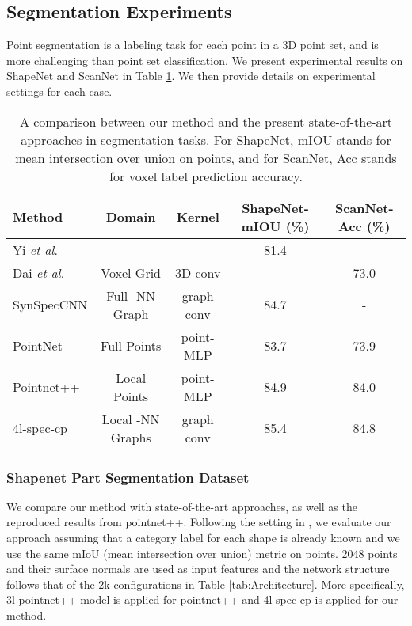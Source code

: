 \documentclass[runningheads]{llncs}
\newcommand{\etal}{\textit{et al}. }
\begin{document}
\subsection{Segmentation Experiments}
Point segmentation is a labeling task for each point in a 3D point set, and is more challenging than point set classification. We present experimental results on ShapeNet \cite{yi2016scalable} and ScanNet \cite{dai2017scannet} in Table \ref{tab:seg}.
We then provide details on experimental settings for each case.

\begin{table}[h]
    \centering
        \small
        \renewcommand{\arraystretch}{1.2}
 	\begin{tabular}[width=\linewidth]{l|c|c|c|c}
        \hline
        Method & Domain & Kernel  & ShapeNet-mIOU (\%) & ScanNet-Acc (\%)  \\
        \hline
Yi \etal \cite{yi2016scalable} & - & - & 81.4 & - \\
        Dai \etal \cite{dai2017scannet} & Voxel Grid & 3D conv & - & 73.0 \\
        SynSpecCNN \cite{yi2017syncspeccnn} & Full -NN Graph & graph conv &  84.7 & - \\
        PointNet~\cite{qi2016pointnet} & Full Points & point-MLP & 83.7 & 73.9  \\ 
        \hline
        \hline
        Pointnet++ \cite{qi2017pointnet} & Local Points & point-MLP &  84.9 & 84.0 \\
        4l-spec-cp & Local -NN Graphs & graph conv &  \cellcolor{pink}  85.4 & \cellcolor{pink} 84.8 \\
        \hline
    \end{tabular}
    \vspace{0.2cm}
    \caption{A comparison between our method and the present state-of-the-art approaches in segmentation tasks. For ShapeNet, mIOU stands for mean intersection over union on points, and for ScanNet, Acc stands for voxel label prediction accuracy.} 
    \label{tab:seg}
     \vspace{-.5cm}
 \end{table}


\subsubsection{Shapenet Part Segmentation Dataset}\label{sec:exp_shapenet}
We compare our method with state-of-the-art approaches, as well as the reproduced results from pointnet++. Following the setting in \cite{yi2016scalable}, we evaluate our approach assuming that a category label for each shape is already known and we use the same mIoU (mean intersection over union) metric on points. 2048  points and their surface normals are used as input features and the network structure follows that of the 2k configurations in Table \ref{tab:Architecture}. More specifically, 3l-pointnet++ model is applied for pointnet++ and 4l-spec-cp is applied for our method. 
\end{document}
